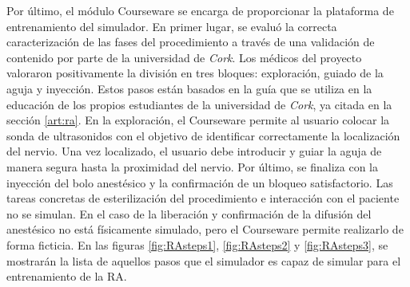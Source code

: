 Por último, el módulo \ac{Courseware} se encarga de proporcionar la plataforma de entrenamiento del simulador.
En primer lugar, se evaluó la correcta caracterización de las fases del procedimiento a través de una validación de contenido por parte de la universidad de \emph{Cork}. Los médicos del proyecto valoraron positivamente la división en tres bloques: exploración, guiado de la aguja y inyección. Estos pasos están basados en la guía que se utiliza en la educación de los propios estudiantes de la universidad de \emph{Cork}, ya citada en la sección \ref{art:ra}. En la exploración, el \ac{Courseware} permite al usuario colocar la sonda de ultrasonidos con el objetivo de identificar correctamente la localización del nervio. Una vez localizado, el usuario debe introducir y guiar la aguja de manera segura hasta la proximidad del nervio. Por último, se finaliza con la inyección del bolo anestésico y la confirmación de un bloqueo satisfactorio. Las tareas concretas de esterilización del procedimiento e interacción con el paciente no se simulan. En el caso de la liberación y  confirmación de la difusión del anestésico no está físicamente simulado, pero el \ac{Courseware} permite realizarlo de forma ficticia. En las figuras \ref{fig:RAsteps1}, \ref{fig:RAsteps2} y \ref{fig:RAsteps3}, se mostrarán la lista de aquellos pasos que el simulador es capaz de simular para el entrenamiento de la \ac{RA}.


